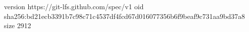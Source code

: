 version https://git-lfs.github.com/spec/v1
oid sha256:bd21ecb3391b7c98c71c4537df4fcd67d016077356b6f9beaf9c731aa9bd37a8
size 2912
